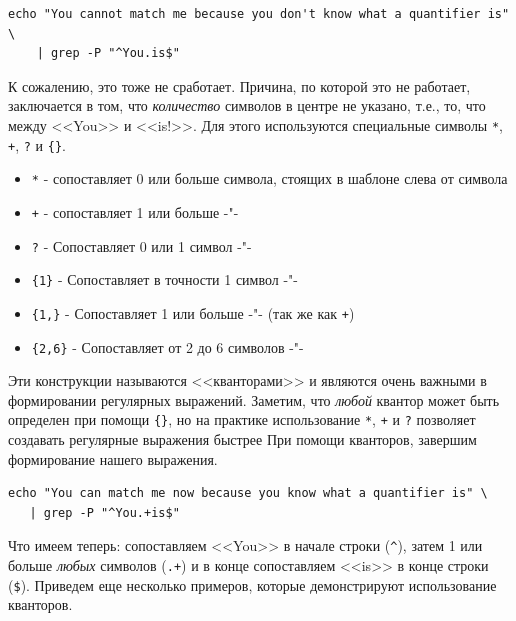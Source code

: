 \documentclass[12pt]{article}
\providecommand{\tightlist}{%
  \setlength{\itemsep}{0pt}\setlength{\parskip}{0pt}}
\begin{document}
\begin{verbatim}
echo "You cannot match me because you don't know what a quantifier is" \
    | grep -P "^You.is$"
\end{verbatim}

К сожалению, это тоже не сработает. Причина, по которой это не работает,
заключается в том, что \emph{количество} символов в центре не указано,
т.е., то, что между <<You>> и <<is!>>. Для этого используются специальные
символы \texttt{*}, \texttt{+}, \texttt{?} и \texttt{\{\}}.

\begin{itemize}
\tightlist
\item
  \texttt{*} - сопоставляет 0 или больше символа, стоящих в шаблоне
  слева от символа
\item
  \texttt{+} - сопоставляет 1 или больше -"-
\item
  \texttt{?} - Сопоставляет 0 или 1 символ -"-
\item
  \texttt{\{1\}} - Сопоставляет в точности 1 символ -"-
\item
  \texttt{\{1,\}} - Сопоставляет 1 или больше -"- (так же как
  \texttt{+})
\item
  \texttt{\{2,6\}} - Сопоставляет от 2 до 6 символов -"-
\end{itemize}

Эти конструкции называются <<кванторами>> и являются очень важными в
формировании регулярных выражений. Заметим, что \emph{любой} квантор
может быть определен при помощи \texttt{\{\}}, но на практике
использование \texttt{*}, \texttt{+} и \texttt{?} позволяет создавать
регулярные выражения быстрее При помощи кванторов, завершим формирование
нашего выражения.

\begin{verbatim}
echo "You can match me now because you know what a quantifier is" \
   | grep -P "^You.+is$"
\end{verbatim}

Что имеем теперь: сопоставляем <<You>> в начале строки (\texttt{\^{}}),
затем 1 или больше \emph{любых} символов (\texttt{.+}) и в конце
сопоставляем <<is>> в конце строки (\texttt{\$}). Приведем еще несколько
примеров, которые демонстрируют использование кванторов.
\end{document}
